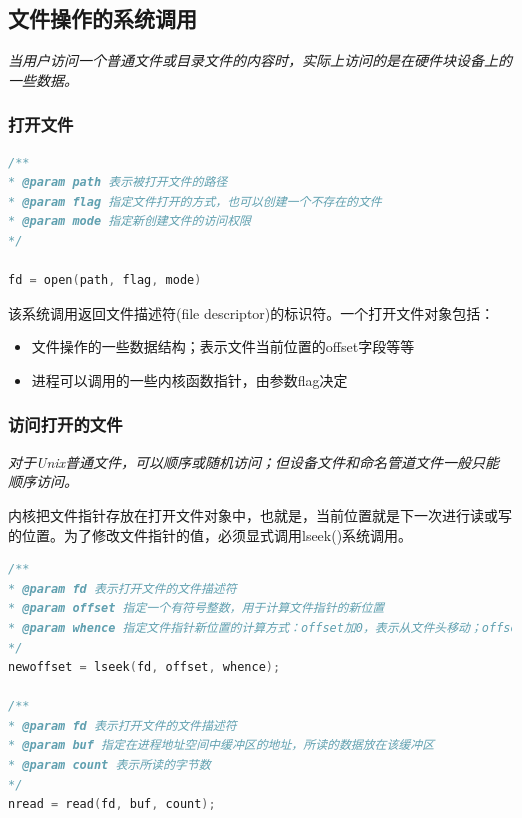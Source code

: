 \subsection{文件操作的系统调用}

    \emph{当用户访问一个普通文件或目录文件的内容时，实际上访问的是在硬件块设备上的一些数据。}

\subsubsection{打开文件}

\begin{lstlisting}[language=C++]
/**
* @param path 表示被打开文件的路径
* @param flag 指定文件打开的方式，也可以创建一个不存在的文件
* @param mode 指定新创建文件的访问权限
*/

fd = open(path, flag, mode)
\end{lstlisting}

    该系统调用返回文件描述符(file descriptor)的标识符。一个打开文件对象包括：

\begin{itemize}
    \item 文件操作的一些数据结构；表示文件当前位置的offset字段等等
    \item 进程可以调用的一些内核函数指针，由参数flag决定
\end{itemize}

\subsubsection{访问打开的文件}

    \emph{对于Unix普通文件，可以顺序或随机访问；但设备文件和命名管道文件一般只能顺序访问。}

    内核把文件指针存放在打开文件对象中，也就是，当前位置就是下一次进行读或写的位置。为了修改文件指针的值，必须显式调用lseek()系统调用。

\begin{lstlisting}[language=C++]
/**
* @param fd 表示打开文件的文件描述符
* @param offset 指定一个有符号整数，用于计算文件指针的新位置
* @param whence 指定文件指针新位置的计算方式：offset加0，表示从文件头移动；offset加文件指针当前位置，表示从当前移动等
*/
newoffset = lseek(fd, offset, whence);

/**
* @param fd 表示打开文件的文件描述符
* @param buf 指定在进程地址空间中缓冲区的地址，所读的数据放在该缓冲区
* @param count 表示所读的字节数
*/
nread = read(fd, buf, count);
\end{lstlisting}

